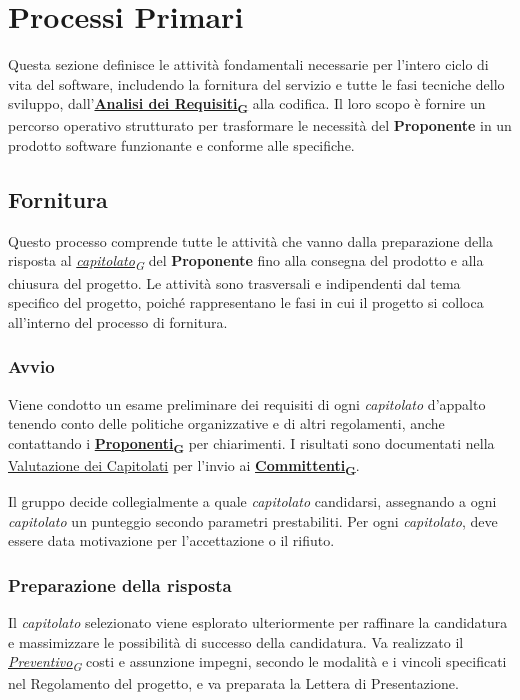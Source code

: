 \documentclass[12pt, a4paper]{article}
\newcommand{\urlglossario}{https://skynetunigroup.github.io/Code_Guardian/Documentazione/RTB/glossario_v1.0.0.pdf} %
\newcommand{\glo}[2]{\href{\urlglossario\#nameddest=#2}{#1\textsubscript{G}}}
\begin{document}
\newpage
\section{Processi Primari}
Questa sezione definisce le attività fondamentali necessarie per l'intero ciclo di vita del software, includendo la fornitura del servizio e tutte le fasi tecniche dello sviluppo, dall'\textbf{\glo{Analisi dei Requisiti}{analisi-dei-requisiti}} alla codifica. Il loro scopo è fornire un percorso operativo strutturato per trasformare le necessità del \textbf{Proponente} in un prodotto software funzionante e conforme alle specifiche.

\subsection{Fornitura}
Questo processo comprende tutte le attività che vanno dalla preparazione della risposta al \textit{\glo{capitolato}{capitolato}} del \textbf{Proponente} fino alla consegna del prodotto e alla chiusura del progetto. Le attività sono trasversali e indipendenti dal tema specifico del progetto, poiché rappresentano le fasi in cui il progetto si colloca all'interno del processo di fornitura.

\subsubsection{Avvio}
Viene condotto un esame preliminare dei requisiti di ogni \textit{capitolato} d'appalto tenendo conto delle politiche organizzative e di altri regolamenti, anche contattando i \textbf{\glo{Proponenti}{proponente}} per chiarimenti. I risultati sono documentati nella \href{https://github.com/SkynetUniGroup/Code_Guardian/blob/main/Documentazione/Candidatura/valutazione_capitolati_v1.0.pdf}{Valutazione dei Capitolati} per l'invio ai \textbf{\glo{Committenti}{committente}}. 

Il gruppo decide collegialmente a quale \textit{capitolato} candidarsi, assegnando a ogni \textit{capitolato} un punteggio secondo parametri prestabiliti. Per ogni \textit{capitolato}, deve essere data motivazione per l'accettazione o il rifiuto.

\subsubsection{Preparazione della risposta}
Il \textit{capitolato} selezionato viene esplorato ulteriormente per raffinare la candidatura e massimizzare le possibilità di successo della candidatura. Va realizzato il \textit{\glo{Preventivo}{preventivo}} costi e assunzione impegni, secondo le modalità e i vincoli specificati nel Regolamento del progetto, e va preparata la Lettera di Presentazione.
\end{document}
